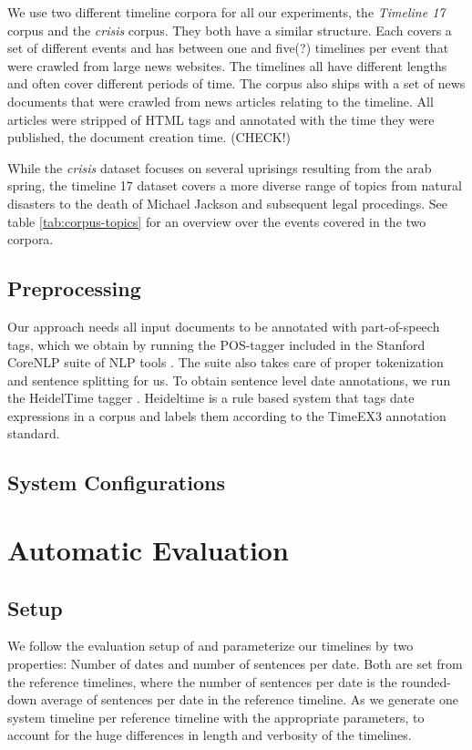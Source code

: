 \documentclass[a4paper,BCOR=10mm]{report}
\begin{document}
We use two different timeline corpora for all our experiments, the \textit{Timeline 17} corpus \citet{tran-tl17} and the \textit{crisis} corpus. They both have a similar structure. Each covers a set of different events and has between one and five(?) timelines per event that were crawled from large news websites. The timelines all have different lengths and often cover different periods of time. The corpus also ships with a set of news documents that were crawled from news articles relating to the timeline. All articles were stripped of HTML tags and annotated with the time they were published, the document creation time. (CHECK!)

While the \textit{crisis} dataset focuses on several uprisings resulting from the arab spring, the timeline 17 dataset covers a more diverse range of topics from natural disasters to the death of Michael Jackson and subsequent legal procedings. See table \ref{tab:corpus-topics} for an overview over the events covered in the two corpora.

\section{Preprocessing}

Our approach needs all input documents to be annotated with part-of-speech tags, which we obtain by running the POS-tagger included in the Stanford CoreNLP suite of NLP tools \citep{stanford-corenlp}. The suite also takes care of proper tokenization and sentence splitting for us.
To obtain sentence level date annotations, we run the HeidelTime tagger \citet{heideltime}. Heideltime is a rule based system that tags date expressions in a corpus and labels them according to the TimeEX3 annotation standard.

\section{System Configurations}



\chapter{Automatic Evaluation}

\section{Setup}

We follow the evaluation setup of \citet{markert} and parameterize our timelines by two properties: Number of dates and number of sentences per date. Both are set from the reference timelines, where the number of sentences per date is the rounded-down average of sentences per date in the reference timeline.
As \citeauthor{markert} we generate one system timeline per reference timeline with the appropriate parameters, to account for the huge differences in length and verbosity of the timelines.
\end{document}
